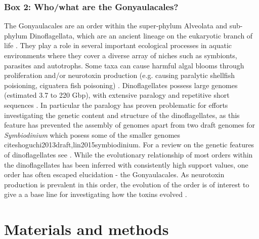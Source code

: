 \documentclass[12pt]{article}
\begin{document}
\subsubsection*{Box 2: Who/what are the Gonyaulacales?}
The Gonyaulacales are an order within the super-phylum Alveolata and sub-phylum Dinoflagellata, which are an ancient lineage on the eukaryotic branch of life \cite{moldowan1998biogeochemical}. 
They play a role in several important ecological processes in aquatic environments where they cover a diverse array of niches such as symbionts, parasites and autotrophs. 
Some taxa can cause harmful algal blooms through proliferation and/or neurotoxin production (e.g. causing paralytic shellfish poisioning, ciguatera fish poisoning) \cite{murray2016unravelling}.
Dinoflagellates possess large genomes (estimated 3.7 to 220 Gbp), with extensive paralogy and repetitive short sequences  \cite{casabianca2017genome,murray2016unravelling}. 
In particular the paralogy has proven problematic for efforts investigating the genetic content and structure of the dinoflagellates, as this feature has prevented the assembly of genomes apart from two draft genomes for \textit{Symbiodinium} which posess some of the smaller genomes 
cite{shoguchi2013draft,lin2015symbiodinium}. 
For a review on the genetic features of dinoflagellates see \cite{murray2016unravelling}. 
While the evolutionary relationship of most orders within the dinoflagellates has been inferred with consistently high support values, one order has often escaped elucidation - the Gonyaulacales. 
As neurotoxin production is prevalent in this order, the evolution of the order is of interest to give a a base line for investigating how the toxins evolved \cite{shalchian2006combined,zhang2007three,saldarriaga2004molecular,hoppenrath2010dinoflagellate,murray2005improving}. 

\newpage
\section{Materials and methods}
\end{document}

